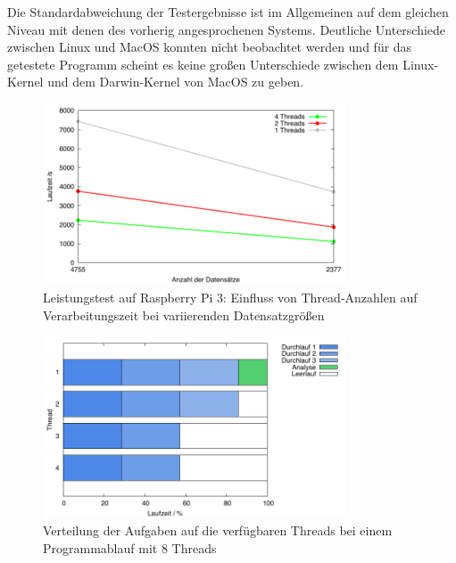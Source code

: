 Die Standardabweichung der Testergebnisse ist im Allgemeinen auf dem gleichen Niveau mit denen des vorherig angesprochenen Systems. Deutliche Unterschiede zwischen Linux und MacOS konnten nicht beobachtet werden und für das getestete Programm scheint es keine großen Unterschiede zwischen dem Linux-Kernel und dem Darwin-Kernel von MacOS zu geben.

\begin{figure}[H]
\centering
\includegraphics[width=0.8\textwidth]{../results/plots/raspberrypi3/comp_all_threads.pdf}
\caption{Leistungstest auf Raspberry Pi 3: Einfluss von Thread-Anzahlen auf Verarbeitungszeit bei variierenden Datensatzgrößen}
\label{fig:raspi_benchmark_threads}
\end{figure}

\begin{figure}[htbp!]
  \centering
  \includegraphics[width=0.8\textwidth]{../results/plots/timeline/timeline_plot_4threads.pdf}
  \caption{Verteilung der Aufgaben auf die verfügbaren Threads bei einem Programmablauf mit 8 Threads}
  \label{fig:runtime_timeline_4threads}
\end{figure}

